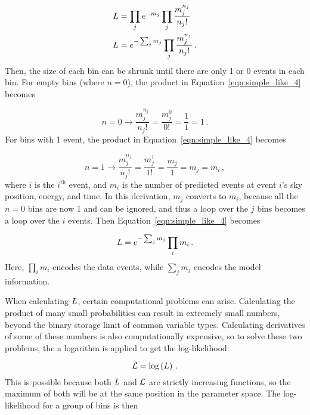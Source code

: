   \begin{equation}\label{eqn:simple_like_4}
    \begin{aligned}
      L &= \prod_j e^{-m_j} \prod_j \frac{m_j^{n_j}}{n_{j}!} \\
      L &= e^{- \sum_j m_j} \prod_j \frac{m_j^{n_j}}{n_{j}!} \,.
    \end{aligned}
  \end{equation}
  Then, the size of each bin can be shrunk until there are only 1 or 0 events in each bin.
  For empty bins (where $n=0$), the product in Equation~\ref{eqn:simple_like_4} becomes
  
  \begin{equation}\label{eqn:simple_like_4a}
    n=0 \rightarrow \frac{m_j^{n_j}}{n_j!} = \frac{m_j^{0}}{0!} = \frac{1}{1} = 1 \,.
  \end{equation}
  For bins with 1 event, the product in Equation~\ref{eqn:simple_like_4} becomes

  \begin{equation}\label{eqn:simple_like_4b}
    n=1 \rightarrow \frac{m_j^{n_j}}{n_j!} = \frac{m_j^1}{1!} = \frac{m_j}{1} = m_j = m_i \,,
  \end{equation}
  where $i$ is the $i^{\textrm{th}}$ event, and $m_i$ is the number of predicted events at event $i$'s sky position, energy, and time.
  In this derivation, $m_j$ converts to $m_i$, because all the $n=0$ bins are now 1 and can be ignored, and thus a loop over the $j$ bins becomes a loop over the $i$ events.
  Then Equation~\ref{eqn:simple_like_4} becomes
  
  \begin{equation}\label{eqn:simple_like_5}
    L = e^{- \sum_j m_j} \prod_i m_i \,.
  \end{equation}
  Here, $\prod_i m_i$ encodes the data events, while $\sum_j m_{j}$ encodes the model information.
  
  When calculating $L$, certain computational problems can arise.
  Calculating the product of many small probabilities can result in extremely small numbers, beyond the binary storage limit of common variable types.
  Calculating derivatives of some of these numbers is also computationally expensive, so to solve these two problems, the a logarithm is applied to get the log-likelihood:
  
  \begin{equation}\label{eqn:simple_like_6}
    \mathcal{L} = \textrm{log} \left ( L \right )  \,.
  \end{equation}
  This is possible because both $L$ and $\mathcal{L}$ are strictly increasing functions, so the maximum of both will be at the same position in the parameter space.
  The log-likelihood for a group of bins is then
  
